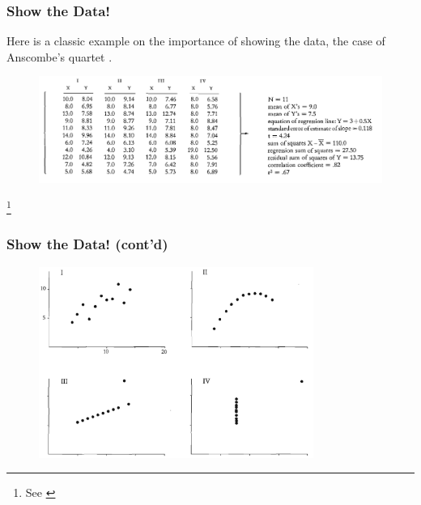 \documentclass[aspectratio=1610]{beamer}
\begin{document}
\begin{frame}
	\frametitle{Show the Data!}
	Here is a classic example on the importance of showing the data,
	the case of Anscombe's quartet \cite{anscombe1973}.

	\begin{figure}
		\begin{small}
			\begin{center}
				\includegraphics[width=1\textwidth]{
					images/anscombe_i.png
				}
			\end{center}
		\end{small}
	\end{figure}
	\footnote{See \cite[][page 14]{tufte2001}}
\end{frame}

\begin{frame}
	\frametitle{Show the Data! (cont'd)}
	\begin{figure}
		\begin{small}
			\begin{center}
				\includegraphics[width=0.80\textwidth]{
					images/anscombe_ii.png
				}
			\end{center}
		\end{small}
	\end{figure}

\end{frame}
\end{document}
